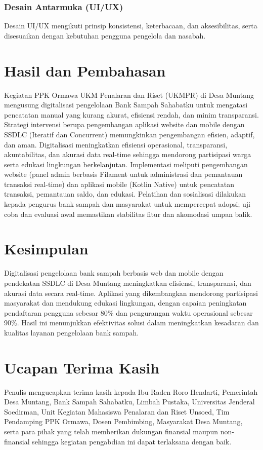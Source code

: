 \documentclass[conference, compsoc, twoside]{IEEEtran}
\begin{document}
\subsubsection{Desain Antarmuka (UI/UX)}
Desain UI/UX mengikuti prinsip konsistensi, keterbacaan, dan aksesibilitas, serta disesuaikan dengan kebutuhan pengguna pengelola dan nasabah.

\section{Hasil dan Pembahasan}
Kegiatan PPK Ormawa UKM Penalaran dan Riset (UKMPR) di Desa Muntang mengusung digitalisasi pengelolaan Bank Sampah Sahabatku untuk mengatasi pencatatan manual yang kurang akurat, efisiensi rendah, dan minim transparansi. Strategi intervensi berupa pengembangan aplikasi website dan mobile dengan SSDLC (Iteratif dan Concurrent) memungkinkan pengembangan efisien, adaptif, dan aman. Digitalisasi meningkatkan efisiensi operasional, transparansi, akuntabilitas, dan akurasi data real-time sehingga mendorong partisipasi warga serta edukasi lingkungan berkelanjutan. Implementasi meliputi pengembangan website (panel admin berbasis Filament untuk administrasi dan pemantauan transaksi real-time) dan aplikasi mobile (Kotlin Native) untuk pencatatan transaksi, pemantauan saldo, dan edukasi. Pelatihan dan sosialisasi dilakukan kepada pengurus bank sampah dan masyarakat untuk mempercepat adopsi; uji coba dan evaluasi awal memastikan stabilitas fitur dan akomodasi umpan balik.

\section{Kesimpulan}
Digitalisasi pengelolaan bank sampah berbasis web dan mobile dengan pendekatan SSDLC di Desa Muntang meningkatkan efisiensi, transparansi, dan akurasi data secara real-time. Aplikasi yang dikembangkan mendorong partisipasi masyarakat dan mendukung edukasi lingkungan, dengan capaian peningkatan pendaftaran pengguna sebesar 80\% dan pengurangan waktu operasional sebesar 90\%. Hasil ini menunjukkan efektivitas solusi dalam meningkatkan kesadaran dan kualitas layanan pengelolaan bank sampah.

\section*{Ucapan Terima Kasih}
 Penulis mengucapkan terima kasih kepada Ibu Raden Roro Hendarti, Pemerintah Desa Muntang, Bank Sampah Sahabatku, Limbah Pustaka, Universitas Jenderal Soedirman, Unit Kegiatan Mahasiswa Penalaran dan Riset Unsoed, Tim Pendamping PPK Ormawa, Dosen Pembimbing, Masyarakat Desa Muntang, serta para pihak yang telah memberikan dukungan finansial maupun non-finansial sehingga kegiatan pengabdian ini dapat terlaksana dengan baik.
\fi
\end{document}
